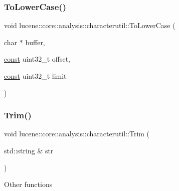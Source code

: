 \subsubsection{\texorpdfstring{To\+Lower\+Case()}{ToLowerCase()}}
{\footnotesize\ttfamily void lucene\+::core\+::analysis\+::characterutil\+::\+To\+Lower\+Case (\begin{DoxyParamCaption}\item[{char $\ast$}]{buffer,  }\item[{\mbox{\hyperlink{ZlibCrc32_8h_a2c212835823e3c54a8ab6d95c652660e}{const}} uint32\+\_\+t}]{offset,  }\item[{\mbox{\hyperlink{ZlibCrc32_8h_a2c212835823e3c54a8ab6d95c652660e}{const}} uint32\+\_\+t}]{limit }\end{DoxyParamCaption})}

\mbox{\label{namespacelucene_1_1core_1_1analysis_1_1characterutil_a8deb75debf79b7151ec2fed2b932bdde}} 
\subsubsection{\texorpdfstring{Trim()}{Trim()}}
{\footnotesize\ttfamily void lucene\+::core\+::analysis\+::characterutil\+::\+Trim (\begin{DoxyParamCaption}\item[{std\+::string \&}]{str }\end{DoxyParamCaption})}

Other functions 